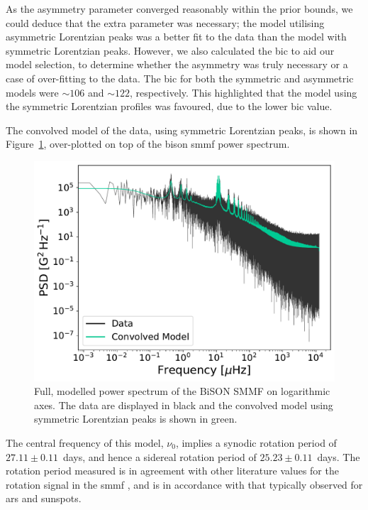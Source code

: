 As the asymmetry parameter converged reasonably within the prior bounds, we could deduce that the extra parameter was necessary; the model utilising asymmetric Lorentzian peaks was a better fit to the data than the model with symmetric Lorentzian peaks. However, we also calculated the \gls{bic} to aid our model selection, to determine whether the asymmetry was truly necessary or a case of over-fitting to the data. The \gls{bic} for both the symmetric and asymmetric models were $\sim106$ and $\sim122$, respectively. This highlighted that the model using the symmetric Lorentzian profiles was favoured, due to the lower \gls{bic} value. 

The convolved model of the data, using symmetric Lorentzian peaks, is shown in Figure~\ref{fig:BiSON_PSD_fit}, over-plotted on top of the \gls{bison} \gls{smmf} power spectrum.


\begin{figure}[ht!]
	\centering
	\includegraphics[width=\columnwidth]{BiSON_PSD_model.pdf}
	\caption{Full, modelled power spectrum of the BiSON SMMF on logarithmic axes. The data are displayed in black and the convolved model using symmetric Lorentzian peaks is shown in green.}
	\label{fig:BiSON_PSD_fit}
\end{figure}


The central frequency of this model, $\nu_0$, implies a synodic rotation period of $27.11\pm0.11$~days, and hence a sidereal rotation period of $25.23\pm0.11$~days. The rotation period measured is in agreement with other literature values for the rotation signal in the \gls{smmf} \citep{chaplin_studies_2003, xie_temporal_2017}, and is in accordance with that typically observed for \glspl{ar} and sunspots.

